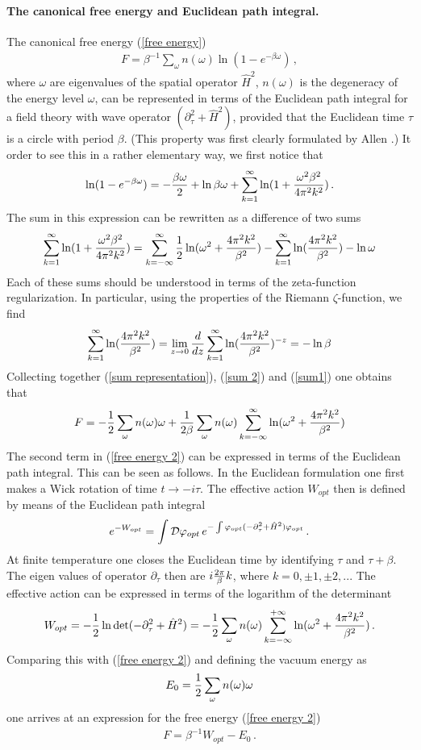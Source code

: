 \documentclass[12pt]{article}
\def\be{\begin{eqnarray}}
\def\ee{\end{eqnarray}}
\def\lb{\label}
\def\o{\over}
\begin{document}
\paragraph*{The canonical free energy and Euclidean path integral.}      The canonical free energy (\ref{free energy})
\be
F=\beta^{-1}\sum_{\omega} n(\omega)\ln(1-e^{-\beta \omega})\, ,
\lb{free energy 3}
\ee
where $\omega$ are eigenvalues of the spatial operator $\hat{H}^2$, $n(\omega)$ is the degeneracy of the energy level $\omega$,  can be represented 
in terms of the Euclidean path integral for a field theory with wave operator $(\partial_\tau^2+\hat{H}^2)$, provided that the Euclidean time $\tau$ is a circle with period $\beta$.
(This property was first clearly formulated by Allen  \cite{Allen:1986qi}.) It order to see  this   in a rather elementary way, we first notice that
\be
\ln(1-e^{-\beta \omega})=-{\beta\omega\o 2}+\ln\beta\omega+\sum_{k=1}^\infty \ln(1+{\omega^2\beta^2\o 4\pi^2 k^2})\, .
\lb{sum representation}
\ee      
The sum in this expression can be rewritten as a difference of two sums
\be
\sum_{k=1}^\infty \ln(1+{\omega^2\beta^2\o 4\pi^2 k^2})=\sum_{k=-\infty}^\infty {1\o 2}\ln (\omega^2+{4\pi^2 k^2\o \beta^2})-\sum_{k=1}^\infty \ln ({4\pi^2 k^2\o \beta^2})-\ln\omega 
\lb{sum 2}
\ee
Each of these sums should be understood in terms of the  zeta-function regularization. In particular, using the properties of the Riemann $\zeta$-function, we find
\be
\sum_{k=1}^\infty \ln ({4\pi^2 k^2\o \beta^2})=\lim_{z\rightarrow 0}{d\o dz}\sum_{k=1}^\infty \ln ({4\pi^2 k^2\o \beta^2})^{-z}=-\ln\beta
\lb{sum1}
\ee
Collecting together (\ref{sum representation}), (\ref{sum 2}) and (\ref{sum1}) one obtains that
\be
F=-{1\o 2}\sum_\omega n(\omega)\omega +{1\o 2\beta} \sum_{\omega} n(\omega) \sum_{k=-\infty}^\infty \ln (\omega^2+{4\pi^2 k^2\o \beta^2})
\lb{free energy 2}
\ee
The second term in (\ref{free energy 2}) can be expressed in terms of the Euclidean path integral. This can be seen as follows.  In the  Euclidean formulation one first makes a Wick rotation of time $t\rightarrow -i\tau$. The  effective action $W_{opt}$ then is defined by means of the Euclidean path integral
\be
e^{-W_{opt}}=\int {\cal D}\varphi_{opt}\, e^{-\int \varphi_{opt}(-\partial_\tau^2+\hat{H}^2)\varphi_{opt}}\, .
\lb{effective action optical}
\ee      
At finite temperature one closes the Euclidean time by identifying $\tau$ and $\tau+\beta$. The eigen values of operator $\partial_\tau$ then are $i{2\pi\o \beta}k$, where $k=0,\pm 1,\pm 2, ..$. The effective action can be expressed in terms of the logarithm of the determinant
\be
W_{opt}=-{1\o 2}\ln\det (-\partial_\tau^2+\hat{H}^2)=-{1\o 2}\sum_\omega n(\omega)\sum_{k=-\infty}^{+\infty}\ln(\omega^2+{4\pi^2 k^2\o \beta^2})\, .
\lb{effective action-opt}
\ee
Comparing this with (\ref{free energy 2}) and  defining the vacuum energy as
\be
E_0={1\o 2}\sum_\omega n(\omega)\omega     
\lb{vacuum energy}
\ee
one arrives at an  expression for the free energy (\ref{free energy 2}) 
\be
F=\beta^{-1}W_{opt}-E_0\, .
\lb{Free energy-effective action}
\ee                 
  
\end{document}
